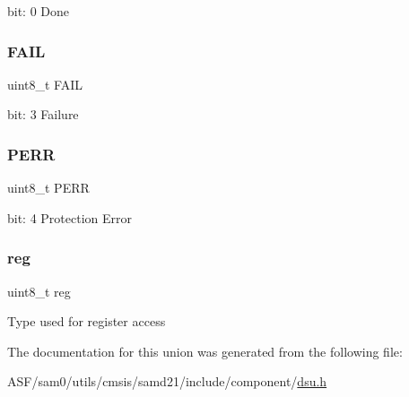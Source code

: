 bit\+: 0 Done \mbox{\label{union_d_s_u___s_t_a_t_u_s_a___type_a04c9f40b75c1bd1e983e8f193dd03202}} 
\subsubsection{\texorpdfstring{FAIL}{FAIL}}
{\footnotesize\ttfamily uint8\+\_\+t F\+A\+IL}

bit\+: 3 Failure \mbox{\label{union_d_s_u___s_t_a_t_u_s_a___type_abb41b7932a36f56f81f4531b37cbd1d1}} 
\subsubsection{\texorpdfstring{PERR}{PERR}}
{\footnotesize\ttfamily uint8\+\_\+t P\+E\+RR}

bit\+: 4 Protection Error \mbox{\label{union_d_s_u___s_t_a_t_u_s_a___type_a9428adc9af4653a2050e2536b55dec8d}} 
\subsubsection{\texorpdfstring{reg}{reg}}
{\footnotesize\ttfamily uint8\+\_\+t reg}

Type used for register access 

The documentation for this union was generated from the following file\+:\begin{DoxyCompactItemize}
\item 
A\+S\+F/sam0/utils/cmsis/samd21/include/component/\mbox{\hyperlink{component_2dsu_8h}{dsu.\+h}}\end{DoxyCompactItemize}
